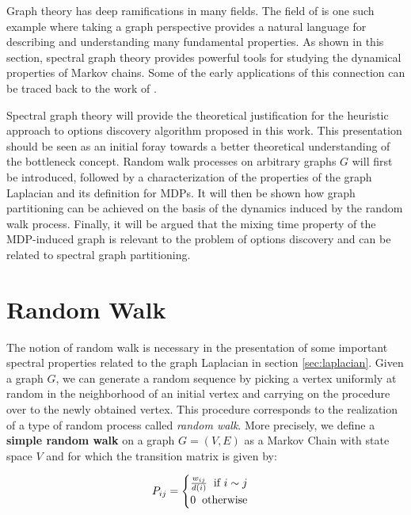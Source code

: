 Graph theory has deep ramifications in many fields. The field of \mdps is one such example where taking a graph perspective provides a natural language for describing and understanding many fundamental properties. As shown in this section, spectral graph theory provides powerful
tools for studying the dynamical properties of Markov chains.  Some of the early
applications of this connection can be traced back to the work of \cite{SimonAndo1961, DonathHoffman1973, Fiedler1973}.

Spectral graph theory will provide the theoretical justification for the heuristic approach
to options discovery algorithm proposed in this work. This presentation should be seen
as an initial foray towards a better theoretical understanding of the bottleneck concept. Random walk  processes on arbitrary graphs
$G$ will first be introduced, followed by a characterization of the properties of the graph Laplacian and its definition for MDPs. It will then be shown how
graph partitioning can be achieved on the basis of the dynamics induced by the random
walk process. Finally, it will be argued that the mixing time property of the MDP-induced
graph is relevant to the problem of options discovery and can be related to spectral graph partitioning.

\section{Random Walk}
\label{sec:random-walk}
The notion of random walk is necessary in the presentation of some important spectral
properties related to the graph Laplacian in section \ref{sec:laplacian}. Given a graph
$G$, we can generate a random sequence by picking a vertex uniformly at
random in the neighborhood of an initial vertex and carrying on the procedure over to the
newly obtained vertex. This procedure corresponds to the realization of a type of
random process called \textit{random walk}. More precisely, we define a \textbf{simple
random walk} on a graph $G = (V, E)$ as a Markov Chain with state space $V$ and for
which the transition matrix is given by:

\begin{equation}
P_{ij} = \begin{cases} 
\frac{w_{ij}}{d(i)} \hspace{2mm} \mbox{if $i \sim j$} \\
0 \hspace{2mm} \mbox{otherwise}
\end{cases}
\end{equation}

